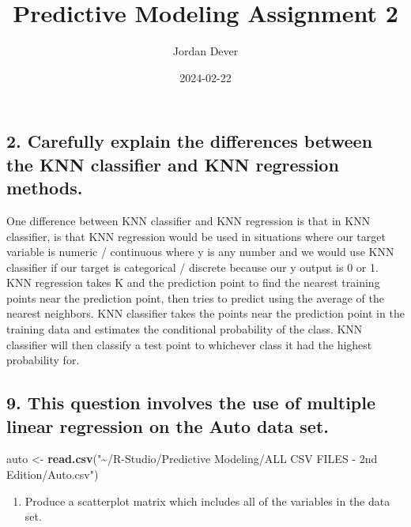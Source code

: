 \documentclass[
]{article}
\title{Predictive Modeling Assignment 2}
\author{Jordan Dever}
\date{2024-02-22}
\newenvironment{Shaded}{\begin{snugshade}}{\end{snugshade}}
\newcommand{\FunctionTok}[1]{\textcolor[rgb]{0.13,0.29,0.53}{\textbf{#1}}}
\newcommand{\NormalTok}[1]{#1}
\newcommand{\OtherTok}[1]{\textcolor[rgb]{0.56,0.35,0.01}{#1}}
\newcommand{\StringTok}[1]{\textcolor[rgb]{0.31,0.60,0.02}{#1}}
\providecommand{\tightlist}{%
  \setlength{\itemsep}{0pt}\setlength{\parskip}{0pt}}
\begin{document}
\maketitle

\hypertarget{carefully-explain-the-differences-between-the-knn-classifier-and-knn-regression-methods.}{%
\subsection{2. Carefully explain the differences between the KNN
classifier and KNN regression
methods.}\label{carefully-explain-the-differences-between-the-knn-classifier-and-knn-regression-methods.}}

One difference between KNN classifier and KNN regression is that in KNN
classifier, is that KNN regression would be used in situations where our
target variable is numeric / continuous where y is any number and we
would use KNN classifier if our target is categorical / discrete because
our y output is 0 or 1. KNN regression takes K and the prediction point
to find the nearest training points near the prediction point, then
tries to predict using the average of the nearest neighbors. KNN
classifier takes the points near the prediction point in the training
data and estimates the conditional probability of the class. KNN
classifier will then classify a test point to whichever class it had the
highest probability for.

\hypertarget{this-question-involves-the-use-of-multiple-linear-regression-on-the-auto-data-set.}{%
\subsection{9. This question involves the use of multiple linear
regression on the Auto data
set.}\label{this-question-involves-the-use-of-multiple-linear-regression-on-the-auto-data-set.}}

\begin{Shaded}
\begin{Highlighting}[]
\NormalTok{auto }\OtherTok{\textless{}{-}} \FunctionTok{read.csv}\NormalTok{(}\StringTok{"\textasciitilde{}/R{-}Studio/Predictive Modeling/ALL CSV FILES {-} 2nd Edition/Auto.csv"}\NormalTok{)}
\end{Highlighting}
\end{Shaded}

\begin{enumerate}
\def\labelenumi{(\alph{enumi})}
\tightlist
\item
  Produce a scatterplot matrix which includes all of the variables in
  the data set.
\end{enumerate}
\end{document}
